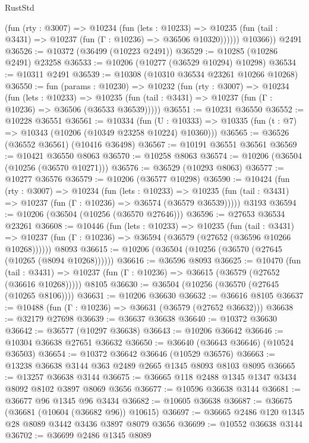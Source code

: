 \begin{lexlean}{RustStd}
\begin{coremodule}
            (fun (rty : @3007) =>
            @10234
              (fun (lets : @10233) =>
              @10235 (fun (tail : @3431) => @10237 (fun (Γ : @10236) => @36506 @10320))))))
        @10366))
    @2491
@36526 := @10372 (@36499 (@10223 @2491))
@36529 := @10285 (@10286 @2491) @23258
@36533 := @10206 (@10277 (@36529 @10294) @10298)
@36534 := @10311 @2491
@36539 := @10308 (@10310 @36534 @23261 @10266 @10268)
@36550 := fun (params : @10230) =>
  @10232
    (fun (rty : @3007) =>
    @10234
      (fun (lets : @10233) =>
      @10235 (fun (tail : @3431) => @10237 (fun (Γ : @10236) => @36506 (@36533 @36539)))))
@36551 := @10231 @36550
@36552 := @10228 @36551
@36561 := @10334
    (fun (U : @10333) => @10335 (fun (t : @7) => @10343 (@10206 (@10349 @23258 @10224) @10360)))
@36565 := @36526 (@36552 @36561) (@10416 @36498)
@36567 := @10191 @36551 @36561
@36569 := @10421 @36550 @8063
@36570 := @10258 @8063
@36574 := @10206 (@36504 (@10256 (@36570 @10271)))
@36576 := @36529 (@10293 @8063)
@36577 := @10277 @36576
@36579 := @10206 (@36577 @10298)
@36590 := @10424
    (fun (rty : @3007) =>
    @10234
      (fun (lets : @10233) =>
      @10235 (fun (tail : @3431) => @10237 (fun (Γ : @10236) => @36574 (@36579 @36539)))))
    @3193
@36594 := @10206 (@36504 (@10256 (@36570 @27646)))
@36596 := @27653 @36534 @23261
@36608 := @10446
    (fun (lets : @10233) =>
    @10235
      (fun (tail : @3431) =>
      @10237 (fun (Γ : @10236) => @36594 (@36579 (@27652 (@36596 @10266 @10268))))))
    @8093
@36615 := @10206 (@36504 (@10256 (@36570 (@27645 (@10265 (@8094 @10268))))))
@36616 := @36596 @8093
@36625 := @10470
    (fun (tail : @3431) => @10237 (fun (Γ : @10236) => @36615 (@36579 (@27652 (@36616 @10268)))))
    @8105
@36630 := @36504 (@10256 (@36570 (@27645 (@10265 @8106))))
@36631 := @10206 @36630
@36632 := @36616 @8105
@36637 := @10488 (fun (Γ : @10236) => @36631 (@36579 (@27652 @36632)))
@36638 := @32179 @27698
@36639 := @36637 @36638
@36640 := @10372 @36630
@36642 := @36577 (@10297 @36638)
@36643 := @10206 @36642
@36646 := @10304 @36638 @27651 @36632
@36650 := @36640 (@36643 @36646) (@10524 @36503)
@36654 := @10372 @36642 @36646 (@10529 @36576)
@36663 := @13238 @36638 @3144 @363 @2489 @2665 @1345 @8093 @8103 @8095
@36665 := @13257 @36638 @3144
@36675 := @36665 @118 @2488 @1345 @1347 @3434 @8092 @8102 @3897 @8069 @3656
@36677 := @10596 @36638 @3144
@36681 := @36677 @96 @1345 @96 @3434
@36682 := @10605 @36638
@36687 := @36675 (@36681 (@10604 (@36682 @96)) @10615)
@36697 := @36665 @2486 @120 @1345 @28 @8089 @3442 @3436 @3897 @8079 @3656
@36699 := @10552 @36638 @3144
@36702 := @36699 @2486 @1345 @8089

\end{coremodule}
\end{lexlean}
